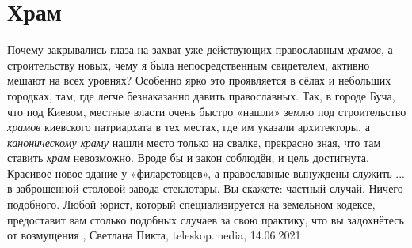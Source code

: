  
 
 
 
 
\chapter{Храм}

Почему закрывались глаза на захват уже действующих православным \emph{храмов}, а
строительству новых, чему я была непосредственным свидетелем, активно мешают на
всех уровнях? Особенно ярко это проявляется в сёлах и небольших городках, там,
где легче безнаказанно давить православных. Так, в городе Буча, что под Киевом,
местные власти очень быстро «нашли» землю под строительство \emph{храмов} киевского
патриархата в тех местах, где им указали архитекторы, а \emph{каноническому храму}
нашли место только на свалке, прекрасно зная, что там ставить \emph{храм} невозможно.
Вроде бы и закон соблюдён, и цель достигнута. Красивое новое здание у
«филаретовцев», а православные вынуждены служить ... в заброшенной столовой
завода стеклотары. Вы скажете: частный случай. Ничего подобного. Любой юрист,
который специализируется на земельном кодексе, предоставит вам столько подобных
случаев за свою практику, что вы задохнётесь от возмущения
, 
Светлана Пикта, teleskop.media, 14.06.2021

